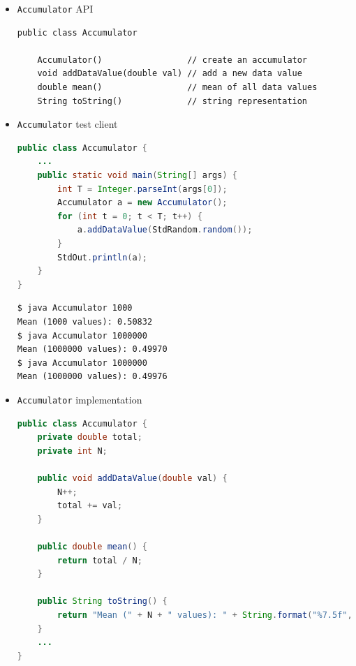 \documentclass[8pt,a4paper,compress]{beamer}
\begin{document}
\begin{frame}[fragile]
\begin{itemize}
\item \lstinline{Accumulator} API
\begin{lstlisting}[language={},mathescape]
public class Accumulator

    Accumulator()                 // create an accumulator
    void addDataValue(double val) // add a new data value
    double mean()                 // mean of all data values
    String toString()             // string representation
\end{lstlisting}

\item \lstinline{Accumulator} test client
\begin{lstlisting}[language=Java]
public class Accumulator {
    ...
    public static void main(String[] args) {
        int T = Integer.parseInt(args[0]);
        Accumulator a = new Accumulator();
        for (int t = 0; t < T; t++) {
            a.addDataValue(StdRandom.random());
        }
        StdOut.println(a);
    }
}
\end{lstlisting}

\begin{lstlisting}[language={}]
$ java Accumulator 1000
Mean (1000 values): 0.50832
$ java Accumulator 1000000
Mean (1000000 values): 0.49970
$ java Accumulator 1000000
Mean (1000000 values): 0.49976
\end{lstlisting}
\end{itemize}
\end{frame}

\begin{frame}[fragile]
\begin{itemize}
\item \lstinline{Accumulator} implementation
\begin{lstlisting}[language=Java]
public class Accumulator {
    private double total;
    private int N;

    public void addDataValue(double val) {
        N++;
        total += val;
    }

    public double mean() {
        return total / N;
    }

    public String toString() {
        return "Mean (" + N + " values): " + String.format("%7.5f", mean());
    }
    ...
}
\end{lstlisting}
\end{itemize}
\end{frame}
\end{document}
